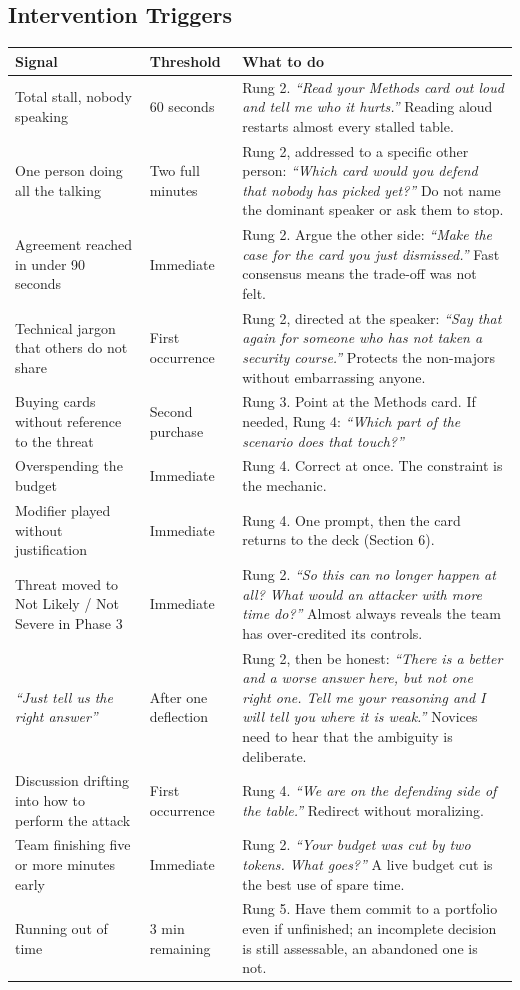 \documentclass[11pt,letterpaper]{article}
\newcommand{\say}[1]{\textit{``#1''}}
\begin{document}
\subsection{Intervention Triggers}

\begin{center}
\small
\begin{longtable}{@{}p{3.1cm} p{2.1cm} p{7.6cm}@{}}
\toprule
\textbf{Signal} & \textbf{Threshold} & \textbf{What to do} \\
\midrule
\endhead
Total stall, nobody speaking & 60 seconds & Rung 2. \say{Read your Methods card
out loud and tell me who it hurts.} Reading aloud restarts almost every stalled
table. \\
One person doing all the talking & Two full minutes & Rung 2, addressed to a
specific other person: \say{Which card would you defend that nobody has picked
yet?} Do not name the dominant speaker or ask them to stop. \\
Agreement reached in under 90 seconds & Immediate & Rung 2. Argue the other
side: \say{Make the case for the card you just dismissed.} Fast consensus means
the trade-off was not felt. \\
Technical jargon that others do not share & First occurrence & Rung 2, directed
at the speaker: \say{Say that again for someone who has not taken a security
course.} Protects the non-majors without embarrassing anyone. \\
Buying cards without reference to the threat & Second purchase & Rung 3. Point
at the Methods card. If needed, Rung 4: \say{Which part of the scenario does
that touch?} \\
Overspending the budget & Immediate & Rung 4. Correct at once. The constraint is
the mechanic. \\
Modifier played without justification & Immediate & Rung 4. One prompt, then the
card returns to the deck (Section 6). \\
Threat moved to Not Likely / Not Severe in Phase 3 & Immediate & Rung 2.
\say{So this can no longer happen at all? What would an attacker with more time
do?} Almost always reveals the team has over-credited its controls. \\
\say{Just tell us the right answer} & After one deflection & Rung 2, then be
honest: \say{There is a better and a worse answer here, but not one right one.
Tell me your reasoning and I will tell you where it is weak.} Novices need to
hear that the ambiguity is deliberate. \\
Discussion drifting into how to perform the attack & First occurrence & Rung 4.
\say{We are on the defending side of the table.} Redirect without moralizing. \\
Team finishing five or more minutes early & Immediate & Rung 2. \say{Your budget
was cut by two tokens. What goes?} A live budget cut is the best use of spare
time. \\
Running out of time & 3 min remaining & Rung 5. Have them commit to a portfolio
even if unfinished; an incomplete decision is still assessable, an abandoned one
is not. \\
\bottomrule
\end{longtable}
\end{center}
\end{document}
